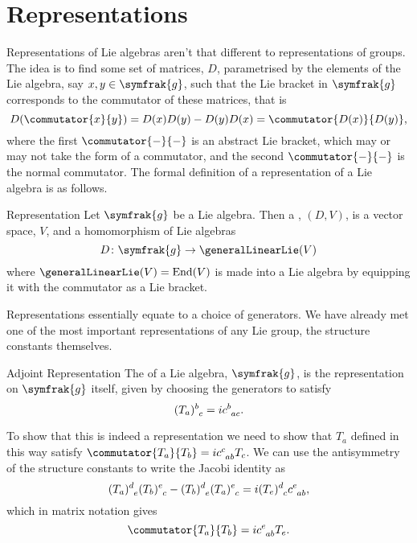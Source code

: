 \documentclass[fleqn]{NotesClass}
\renewcommand{\lie}[1]{\symfrak{#1}}
\DeclareMathOperator{\End}{End}
\begin{document}
    \section{Representations}
    Representations of Lie algebras aren't that different to representations of groups.
    The idea is to find some set of matrices, \(D\), parametrised by the elements of the Lie algebra, say \(x, y \in \lie{g}\), such that the Lie bracket in \(\lie{g}\) corresponds to the commutator of these matrices, that is
    \begin{equation}
        D(\commutator{x}{y}) = D(x)D(y) - D(y)D(x) = \commutator{D(x)}{D(y)},
    \end{equation}
    where the first \(\commutator{-}{-}\) is an abstract Lie bracket, which may or may not take the form of a commutator, and the second \(\commutator{-}{-}\) is the normal commutator.
    The formal definition of a representation of a Lie algebra is as follows.
    
    \begin{dfn}{Representation}{}
        Let \(\lie{g}\) be a Lie algebra.
        Then a , \((D, V)\), is a vector space, \(V\), and a homomorphism of Lie algebras
        \begin{equation}
            D \colon \lie{g} \to \generalLinearLie(V)
        \end{equation}
        where \(\generalLinearLie(V) = \End(V)\) is made into a Lie algebra by equipping it with the commutator as a Lie bracket.
    \end{dfn}
    
    Representations essentially equate to a choice of generators.
    We have already met one of the most important representations of any Lie group, the structure constants themselves.
    
    \begin{dfn}{Adjoint Representation}{}
        The  of a Lie algebra, \(\lie{g}\), is the representation on \(\lie{g}\) itself, given by choosing the generators to satisfy
        \begin{equation}
            \tensor{(T_a)}{^b_c} = i\tensor{c}{^b_{ac}}.
        \end{equation}
    \end{dfn}
    
    To show that this is indeed a representation we need to show that \(T_a\) defined in this way satisfy \(\commutator{T_a}{T_b} = i\tensor{c}{^c_{ab}}T_c\).
    We can use the antisymmetry of the structure constants to write the Jacobi identity as
    \begin{equation}
        \tensor{(T_a)}{^d_e} \tensor{(T_b)}{^e_c} - \tensor{(T_b)}{^d_e}\tensor{(T_a)}{^e_c} = i\tensor{(T_e)}{^d_c} \tensor{c}{^e_{ab}},
    \end{equation}
    which in matrix notation gives
    \begin{equation}
        \commutator{T_a}{T_b} = i\tensor{c}{^e_{ab}}T_e.
    \end{equation}
    
\end{document}
